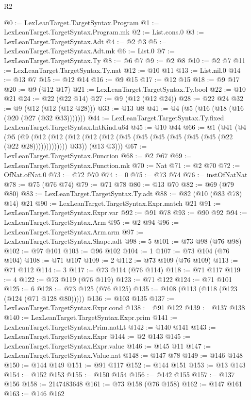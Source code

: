 \begin{lexlean}{R2}
\begin{coremodule}
@0 := LexLeanTarget.TargetSyntax.Program
@1 := LexLeanTarget.TargetSyntax.Program.mk
@2 := List.cons.{0}
@3 := LexLeanTarget.TargetSyntax.Adt
@4 := @2 @3
@5 := LexLeanTarget.TargetSyntax.Adt.mk
@6 := List.{0}
@7 := LexLeanTarget.TargetSyntax.Ty
@8 := @6 @7
@9 := @2 @8
@10 := @2 @7
@11 := LexLeanTarget.TargetSyntax.Ty.nat
@12 := @10 @11
@13 := List.nil.{0}
@14 := @13 @7
@15 := @12 @14
@16 := @9 @15
@17 := @12 @15
@18 := @9 @17
@20 := @9 (@12 @17)
@21 := LexLeanTarget.TargetSyntax.Ty.bool
@22 := @10 @21
@24 := @22 (@22 @14)
@27 := @9 (@12 (@12 @24))
@28 := @22 @24
@32 := @9 (@12 (@12 (@12 @28)))
@33 := @13 @8
@41 := @4 (@5 (@16 (@18 (@16 (@20 (@27 (@32 @33)))))))
@44 := LexLeanTarget.TargetSyntax.Ty.fixed LexLeanTarget.TargetSyntax.IntKind.u64
@45 := @10 @44
@66 := @1
    (@41
      (@4
        (@5
          (@9
            (@12 (@12 (@12 (@12 (@12 (@45 (@45 (@45 (@45 (@45 (@45 (@22 (@22 @28)))))))))))))
            @33))
        (@13 @3)))
@67 := LexLeanTarget.TargetSyntax.Function
@68 := @2 @67
@69 := LexLeanTarget.TargetSyntax.Function.mk
@70 := Nat
@71 := @2 @70
@72 := OfNat.ofNat.{0}
@73 := @72 @70
@74 := 0
@75 := @73 @74
@76 := instOfNatNat
@78 := @75 (@76 @74)
@79 := @71 @78
@80 := @13 @70
@82 := @69 (@79 @80)
@83 := LexLeanTarget.TargetSyntax.Ty.adt
@88 := @82 (@10 (@83 @78) @14) @21
@90 := LexLeanTarget.TargetSyntax.Expr.match @21
@91 := LexLeanTarget.TargetSyntax.Expr.var
@92 := @91 @78
@93 := @90 @92
@94 := LexLeanTarget.TargetSyntax.Arm
@95 := @2 @94
@96 := LexLeanTarget.TargetSyntax.Arm.arm
@97 := LexLeanTarget.TargetSyntax.Shape.adt
@98 := 5
@101 := @73 @98 (@76 @98)
@102 := @97 @101
@103 := @96 @102
@104 := 1
@107 := @73 @104 (@76 @104)
@108 := @71 @107
@109 := 2
@112 := @73 @109 (@76 @109)
@113 := @71 @112
@114 := 3
@117 := @73 @114 (@76 @114)
@118 := @71 @117
@119 := 4
@122 := @73 @119 (@76 @119)
@123 := @71 @122
@124 := @71 @101
@125 := 6
@128 := @73 @125 (@76 @125)
@135 := @108 (@113 (@118 (@123 (@124 (@71 @128 @80)))))
@136 := @103 @135
@137 := LexLeanTarget.TargetSyntax.Expr.cond
@138 := @91 @122
@139 := @137 @138
@140 := LexLeanTarget.TargetSyntax.Expr.prim
@141 := LexLeanTarget.TargetSyntax.Prim.natLt
@142 := @140 @141
@143 := LexLeanTarget.TargetSyntax.Expr
@144 := @2 @143
@145 := LexLeanTarget.TargetSyntax.Expr.value
@146 := @145 @11
@147 := LexLeanTarget.TargetSyntax.Value.nat
@148 := @147 @78
@149 := @146 @148
@150 := @144 @149
@151 := @91 @117
@152 := @144 @151
@153 := @13 @143
@154 := @152 @153
@155 := @150 @154
@156 := @142 @155
@157 := @137 @156
@158 := 2147483648
@161 := @73 @158 (@76 @158)
@162 := @147 @161
@163 := @146 @162

\end{coremodule}
\end{lexlean}
